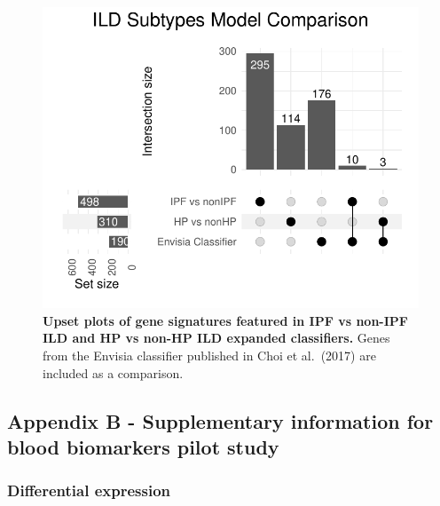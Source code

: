 \documentclass[
]{article}
\begin{document}
\begin{figure}

{\centering \includegraphics[width=0.6\linewidth,]{./Figures/SysReview/FigE10_Envisia} 

}

\caption[Comparison with Envisia classifier]{\textbf{Upset plots of gene signatures featured in IPF vs non-IPF ILD and HP vs non-HP ILD expanded classifiers.} Genes from the Envisia classifier published in Choi et al.~(2017) are included as a comparison.}\label{fig:envisia}
\end{figure}

\clearpage

\subsection{Appendix B - Supplementary information for blood biomarkers pilot study}\label{appendix-b---supplementary-information-for-blood-biomarkers-pilot-study}

\renewcommand{\thefigure}{A3.\arabic{figure}}
\setcounter{figure}{0}
\renewcommand{\thetable}{A3.\arabic{table}}
\setcounter{table}{0}
\renewcommand{\theequation}{A3.\arabic{equation}}
\setcounter{equation}{0}

\captionsetup{width=6.5in}

\subsubsection{Differential expression}\label{differential-expression}
\end{document}

